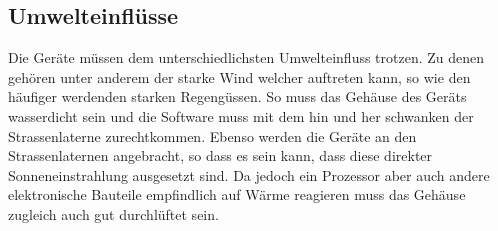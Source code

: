 \subsection{Umwelteinflüsse}
Die Geräte müssen dem unterschiedlichsten Umwelteinfluss trotzen. Zu denen gehören unter anderem der starke Wind welcher auftreten kann, so wie den häufiger werdenden starken Regengüssen. So muss das Gehäuse des Geräts wasserdicht sein und die Software muss mit dem hin und her schwanken der Strassenlaterne zurechtkommen. Ebenso werden die Geräte an den Strassenlaternen angebracht, so dass es sein kann, dass diese direkter Sonneneinstrahlung ausgesetzt sind. Da jedoch ein Prozessor aber auch andere elektronische Bauteile empfindlich auf Wärme reagieren muss das Gehäuse zugleich auch gut durchlüftet sein.